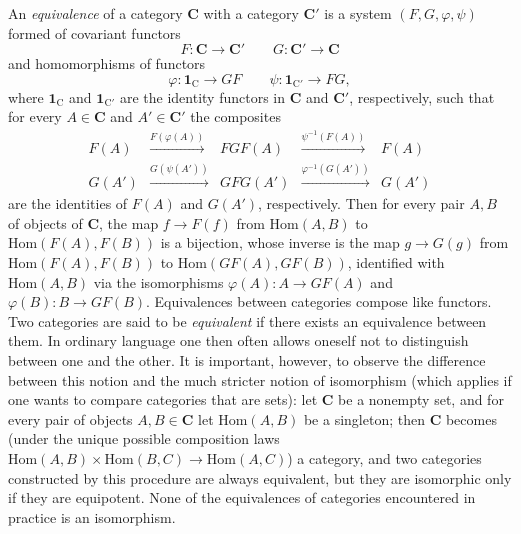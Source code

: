 An \textit{equivalence} of a category $\mathbf{C}$ with a category $\mathbf{C}'$ is a system
$(F,G,\varphi,\psi)$ formed of covariant functors
\[
  F:\mathbf{C}\to\mathbf{C}' \qquad G:\mathbf{C}'\to\mathbf{C}
\]
and homomorphisms of functors
\[
  \varphi:\mathbf{1}_{\mathrm{C}}\to GF \qquad
  \psi:\mathbf{1}_{\mathrm{C}'}\to FG,
\]
where $\mathbf{1}_{\mathrm{C}}$ and $\mathbf{1}_{\mathrm{C}'}$ are the identity functors in $\mathbf{C}$ and $\mathbf{C}'$,
respectively, such that for every $A\in \mathbf{C}$ and $A'\in \mathbf{C}'$ the composites
\[
\begin{array}{ccccc}
F(A) & \stackrel{F(\varphi(A))}{\longrightarrow} & FGF(A) &
\stackrel{\psi^{-1}(F(A))}{\longrightarrow} & F(A) \\
G(A') & \stackrel{G(\psi(A'))}{\longrightarrow} & GFG(A') &
\stackrel{\varphi^{-1}(G(A'))}{\longrightarrow} & G(A')
\end{array}
\]
are the identities of $F(A)$ and $G(A')$, respectively. Then for every pair
$A,B$ of objects of $\mathbf{C}$, the map $f\to F(f)$ from
$\mathrm{Hom}(A,B)$ to $\mathrm{Hom}(F(A),F(B))$ is a bijection, whose inverse
is the map $g\to G(g)$ from $\mathrm{Hom}(F(A),F(B))$ to
$\mathrm{Hom}(GF(A),GF(B))$, identified with $\mathrm{Hom}(A,B)$ via the
isomorphisms $\varphi(A):A\to GF(A)$ and
$\varphi(B):B\to GF(B)$. Equivalences between categories compose
like functors. Two categories are said to be \textit{equivalent} if there
exists an equivalence between them. In ordinary language one then often allows
oneself not to distinguish between one and the other. It is important,
however, to observe the difference between this notion and the much stricter
notion of isomorphism (which applies if one wants to compare categories that
are sets): let $\mathbf{C}$ be a nonempty set, and for every pair of objects $A,B\in \mathbf{C}$
let $\mathrm{Hom}(A,B)$ be a singleton; then $\mathbf{C}$ becomes (under the unique
possible composition laws
$\mathrm{Hom}(A,B)\times\mathrm{Hom}(B,C)\to\mathrm{Hom}(A,C)$) a
category, and two categories constructed by this procedure are always
equivalent, but they are isomorphic only if they are equipotent. None of the
equivalences of categories encountered in practice is an isomorphism.

